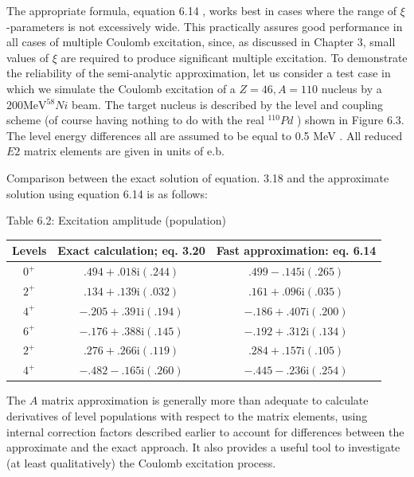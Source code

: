 \documentclass[10pt]{article}
\begin{document}
The appropriate formula, equation 6.14 , works best in cases where the range of $\xi$-parameters is not excessively wide. This practically assures good performance in all cases of multiple Coulomb excitation, since, as discussed in Chapter 3, small values of $\xi$ are required to produce significant multiple excitation. To demonstrate the reliability of the semi-analytic approximation, let us consider a test case in which we simulate the Coulomb excitation of a $Z=46, A=110$ nucleus by a $200 \mathrm{MeV}{ }^{58} N i$ beam. The target nucleus is described by the level and coupling scheme (of course having nothing to do with the real ${ }^{110} P d$ ) shown in Figure 6.3. The level energy differences all are assumed to be equal to 0.5 MeV . All reduced $E 2$ matrix elements are given in units of e.b.

Comparison between the exact solution of equation. 3.18 and the approximate solution using equation 6.14 is as follows:

Table 6.2: Excitation amplitude (population)

\begin{center}
\begin{tabular}{|c|c|c|}
\hline
Levels & Exact calculation; eq. 3.20 & Fast approximation: eq. 6.14 \\
\hline
$0^{+}$ & $.494+.018 \mathrm{i}(.244)$ & $.499-.145 \mathrm{i}(.265)$ \\
\hline
$2^{+}$ & $.134+.139 \mathrm{i}(.032)$ & $.161+.096 \mathrm{i}(.035)$ \\
\hline
$4^{+}$ & $-.205+.391 \mathrm{i}(.194)$ & $-.186+.407 \mathrm{i}(.200)$ \\
\hline
$6^{+}$ & $-.176+.388 \mathrm{i}(.145)$ & $-.192+.312 \mathrm{i}(.134)$ \\
\hline
$2^{+}$ & $.276+.266 \mathrm{i}(.119)$ & $.284+.157 \mathrm{i}(.105)$ \\
\hline
$4^{+}$ & $-.482-.165 \mathrm{i}(.260)$ & $-.445-.236 \mathrm{i}(.254)$ \\
\hline
\end{tabular}
\end{center}

The $A$ matrix approximation is generally more than adequate to calculate derivatives of level populations with respect to the matrix elements, using internal correction factors described earlier to account for differences between the approximate and the exact approach. It also provides a useful tool to investigate (at least qualitatively) the Coulomb excitation process.
\end{document}
